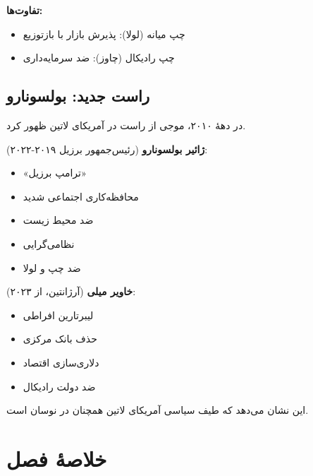\textbf{تفاوت‌ها:}
\begin{itemize}
    \item چپ میانه (لولا): پذیرش بازار با بازتوزیع
    \item چپ رادیکال (چاوز): ضد سرمایه‌داری
\end{itemize}


\subsection{راست جدید: بولسونارو}


در دههٔ ۲۰۱۰، موجی از راست در آمریکای لاتین ظهور کرد.

\textbf{ژائیر بولسونارو} (رئیس‌جمهور برزیل ۲۰۱۹-۲۰۲۲):
\begin{itemize}
    \item «ترامپ برزیل»
    \item محافظه‌کاری اجتماعی شدید
    \item ضد محیط زیست
    \item نظامی‌گرایی
    \item ضد چپ و لولا
\end{itemize}

\textbf{خاویر میلی} (آرژانتین، از ۲۰۲۳):
\begin{itemize}
    \item لیبرتارین افراطی
    \item حذف بانک مرکزی
    \item دلاری‌سازی اقتصاد
    \item ضد دولت رادیکال
\end{itemize}

این نشان می‌دهد که طیف سیاسی آمریکای لاتین همچنان در نوسان است.


\section*{خلاصهٔ فصل}

